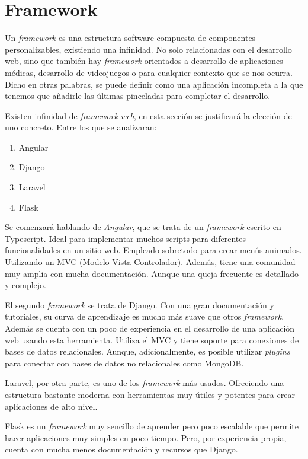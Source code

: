 \section{Framework}
Un \emph{framework} es una estructura software compuesta de componentes personalizables, existiendo una infinidad. No solo relacionadas con el desarrollo web, sino que también hay \emph{framework} orientados a desarrollo de aplicaciones médicas, desarrollo de videojuegos o para cualquier contexto que se nos ocurra. Dicho en otras palabras, se puede definir como una aplicación incompleta a la que tenemos que añadirle las últimas pinceladas para completar el desarrollo. 

Existen infinidad de \emph{framework web}, en esta sección se justificará la elección de uno concreto. Entre los que se analizaran: 
\begin{enumerate}
    \item Angular
    \item Django
    \item Laravel
    \item Flask
\end{enumerate}

Se comenzará hablando de \emph{Angular}, que se trata de un \emph{framework} escrito en Typescript. Ideal para implementar muchos scripts para diferentes funcionalidades en un sitio web. Empleado sobretodo para crear menús animados. Utilizando un MVC (Modelo-Vista-Controlador). Además, tiene una comunidad muy amplia con mucha documentación. Aunque una queja frecuente es detallado y complejo. 

El segundo \emph{framework} se trata de Django. Con una gran documentación y tutoriales, su curva de aprendizaje es mucho más suave que otros \emph{framework}. Además se cuenta con un poco de experiencia en el desarrollo de una aplicación web usando esta herramienta. Utiliza el MVC y tiene soporte para conexiones de bases de datos relacionales. Aunque, adicionalmente, es posible utilizar \emph{plugins} para conectar con bases de datos no relacionales como MongoDB.

Laravel, por otra parte, es uno de los \emph{framework} más usados. Ofreciendo una estructura bastante moderna con herramientas muy útiles y potentes para crear aplicaciones de alto nivel. 

Flask es un \emph{framework} muy sencillo de aprender pero poco escalable que permite hacer aplicaciones muy simples en poco tiempo. Pero, por experiencia propia, cuenta con mucha menos documentación y recursos que Django.

